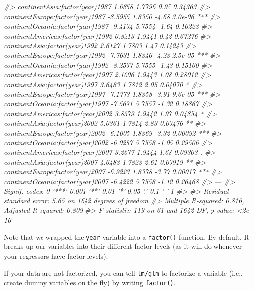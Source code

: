 \documentclass[]{book}
\newenvironment{Shaded}{\begin{snugshade}}{\end{snugshade}}
\newcommand{\CommentTok}[1]{\textcolor[rgb]{0.56,0.35,0.01}{\textit{#1}}}
\begin{document}
\begin{Shaded}
\begin{Highlighting}[]
\CommentTok{#> continentAsia:factor(year)1987       1.6858     1.7796    0.95  0.34363    }
\CommentTok{#> continentEurope:factor(year)1987    -8.5955     1.8350   -4.68  3.0e-06 ***}
\CommentTok{#> continentOceania:factor(year)1987   -9.4104     5.7554   -1.64  0.10223    }
\CommentTok{#> continentAmericas:factor(year)1992   0.8213     1.9441    0.42  0.67276    }
\CommentTok{#> continentAsia:factor(year)1992       2.6127     1.7803    1.47  0.14243    }
\CommentTok{#> continentEurope:factor(year)1992    -7.7631     1.8346   -4.23  2.5e-05 ***}
\CommentTok{#> continentOceania:factor(year)1992   -8.2567     5.7555   -1.43  0.15160    }
\CommentTok{#> continentAmericas:factor(year)1997   2.1006     1.9443    1.08  0.28012    }
\CommentTok{#> continentAsia:factor(year)1997       3.6483     1.7812    2.05  0.04070 *  }
\CommentTok{#> continentEurope:factor(year)1997    -7.1773     1.8358   -3.91  9.6e-05 ***}
\CommentTok{#> continentOceania:factor(year)1997   -7.5691     5.7557   -1.32  0.18867    }
\CommentTok{#> continentAmericas:factor(year)2002   3.8379     1.9442    1.97  0.04854 *  }
\CommentTok{#> continentAsia:factor(year)2002       5.0361     1.7814    2.83  0.00476 ** }
\CommentTok{#> continentEurope:factor(year)2002    -6.1005     1.8369   -3.32  0.00092 ***}
\CommentTok{#> continentOceania:factor(year)2002   -6.0287     5.7558   -1.05  0.29506    }
\CommentTok{#> continentAmericas:factor(year)2007   3.2677     1.9444    1.68  0.09303 .  }
\CommentTok{#> continentAsia:factor(year)2007       4.6483     1.7823    2.61  0.00919 ** }
\CommentTok{#> continentEurope:factor(year)2007    -6.9223     1.8378   -3.77  0.00017 ***}
\CommentTok{#> continentOceania:factor(year)2007   -6.4222     5.7558   -1.12  0.26468    }
\CommentTok{#> ---}
\CommentTok{#> Signif. codes:  0 '***' 0.001 '**' 0.01 '*' 0.05 '.' 0.1 ' ' 1}
\CommentTok{#> }
\CommentTok{#> Residual standard error: 5.65 on 1642 degrees of freedom}
\CommentTok{#> Multiple R-squared:  0.816,  Adjusted R-squared:  0.809 }
\CommentTok{#> F-statistic:  119 on 61 and 1642 DF,  p-value: <2e-16}
\end{Highlighting}
\end{Shaded}

Note that we wrapped the \texttt{year} variable into a \texttt{factor()}
function. By default, R breaks up our variables into their different
factor levels (as it will do whenever your regressors have factor
levels).

If your data are not factorized, you can tell \texttt{lm/glm} to
factorize a variable (i.e., create dummy variables on the fly) by
writing \texttt{factor()}.
\end{document}
